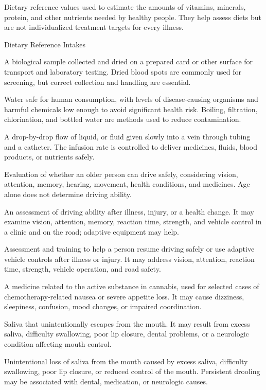  Dietary reference values used to estimate the amounts of vitamins, minerals, protein, and other nutrients needed by healthy people. They help assess diets but are not individualized treatment targets for every illness.

\synonyms
Dietary Reference Intakes

 A biological sample collected and dried on a prepared card or other surface for transport and laboratory testing. Dried blood spots are commonly used for screening, but correct collection and handling are essential.

 Water safe for human consumption, with levels of disease-causing organisms and harmful chemicals low enough to avoid significant health risk. Boiling, filtration, chlorination, and bottled water are methods used to reduce contamination.

 A drop-by-drop flow of liquid, or fluid given slowly into a vein through tubing and a catheter. The infusion rate is controlled to deliver medicines, fluids, blood products, or nutrients safely.

 Evaluation of whether an older person can drive safely, considering vision, attention, memory, hearing, movement, health conditions, and medicines. Age alone does not determine driving ability.

 An assessment of driving ability after illness, injury, or a health change. It may examine vision, attention, memory, reaction time, strength, and vehicle control in a clinic and on the road; adaptive equipment may help.

 Assessment and training to help a person resume driving safely or use adaptive vehicle controls after illness or injury. It may address vision, attention, reaction time, strength, vehicle operation, and road safety.

 A medicine related to the active substance in cannabis, used for selected cases of chemotherapy-related nausea or severe appetite loss. It may cause dizziness, sleepiness, confusion, mood changes, or impaired coordination.

 Saliva that unintentionally escapes from the mouth. It may result from excess saliva, difficulty swallowing, poor lip closure, dental problems, or a neurologic condition affecting mouth control.

 Unintentional loss of saliva from the mouth caused by excess saliva, difficulty swallowing, poor lip closure, or reduced control of the mouth. Persistent drooling may be associated with dental, medication, or neurologic causes.

